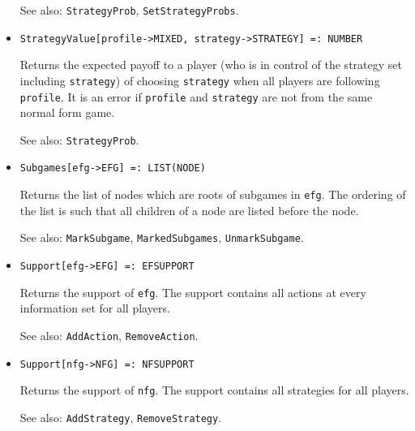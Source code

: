 \begin{itemize}
\bd
Returns a nested list of the probabilities for each strategy under
\verb+profile+.  The \verb+(i,j)+th entry is the probability of player
\verb+i= adopting strategy \verb+j+.
\item [See also:] \verb+StrategyProb+, \verb+SetStrategyProbs+.
\ed

\item{}
\protect \large \begin{verbatim}
StrategyValue[profile->MIXED, strategy->STRATEGY] =: NUMBER 
\end{verbatim}\normalsize

\bd 
Returns the expected payoff to a player (who is in control of the
strategy set including \verb+strategy+) of choosing \verb+strategy+ when
all players are following \verb+profile+.  It is an error if
\verb+profile+ and \verb+strategy+ are not from the same normal form
game.
\item [See also:] \verb+StrategyProb+. 
\ed


\item{}
\protect \large \begin{verbatim}
Subgames[efg->EFG] =: LIST(NODE) 
\end{verbatim}\normalsize

\bd
Returns the list of nodes which are roots of subgames in \verb+efg+.
The ordering of the list is such that
all children of a node are listed before the node.
\item [See also:] \verb+MarkSubgame+, \verb+MarkedSubgames+, 
\verb+UnmarkSubgame+.
\ed

\item{}
\protect \large \begin{verbatim}
Support[efg->EFG] =: EFSUPPORT 
\end{verbatim}\normalsize

\bd
Returns the support of \verb+efg+.  The support contains all actions at every
information set for all players.
\item [See also:] \verb+AddAction+, \verb+RemoveAction+.
\ed

\item{}
\protect \large \begin{verbatim}
Support[nfg->NFG] =: NFSUPPORT 
\end{verbatim}\normalsize

\bd
Returns the support of \verb+nfg+.  The support contains all strategies
for all players.
\item [See also:] \verb+AddStrategy+, \verb+RemoveStrategy+.
\ed


\end{itemize}
